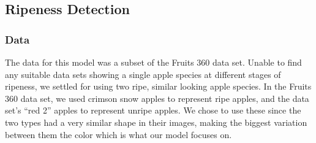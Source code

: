 \subsection{Ripeness Detection}
\subsubsection{Data}
The data for this model was a subset of the Fruits 360 data set\cite{Fruit360}.
Unable to find any suitable data sets showing a single apple species at different stages of ripeness, we settled for using two ripe, similar looking apple species.
In the Fruits 360 data set\cite{Fruit360}, we used crimson snow apples to represent ripe apples, and the data set's ``red 2'' apples to represent unripe apples. We  chose to use these since the two types had a very similar shape in their images, making the biggest variation between them the color which is what our model focuses on.

